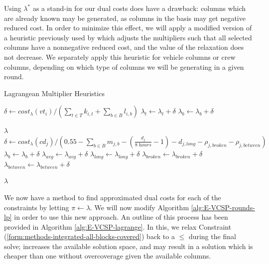 \documentclass[]{article}
\begin{document}
Using $\lambda^*$ as a stand-in for our dual costs does have a drawback: columns which are already known may be generated, as columns in the basis may get negative reduced cost. In order to minimize this effect, we will apply a modified version of a heuristic previously used by \citet{vanKootenNiekerk2017, Freling1997, Carraresi1995} which adjusts the multipliers such that all selected columns have a nonnegative reduced cost, and the value of the relaxation does not decrease. We separately apply this heuristic for vehicle columns or crew columns, depending on which type of columns we will be generating in a given round.
\begin{algorithm}[h]
\caption{Lagrangean Multiplier Heuristics}\label{alg:lagrange-multiplier-vt}
\begin{algorithmic}
 
  \State $\delta \gets cost_\lambda(vt_i) / (\sum_{t \in T} k_{i,t} + \sum_{b \in B} l_{i,b})$
    \State $\lambda_{t} \gets \lambda_{t} + \delta$
  \EndFor
    \State $\lambda_{b} \gets \lambda_{b} + \delta$
  \EndFor
\EndFor

\Return $\lambda$
\EndProcedure\\
 
    \State $\delta \gets cost_\lambda(cd_j) / (0.55 - \sum_{b \in B} m_{j,b} - (\frac{d_{j}}{\textit{8 hours}} - 1) - d_{j,\textit{long}} - \rho_{j,\textit{broken}} - \rho_{j,\textit{between}})$
      \State $\lambda_{b} \gets \lambda_{b} + \delta$
    \EndFor
    \State $\lambda_{avg} \gets \lambda_{avg} + \delta$
    \State $\lambda_{long} \gets \lambda_{long} + \delta$
    \State $\lambda_{broken} \gets \lambda_{broken} + \delta$
    \State $\lambda_{between} \gets \lambda_{between} + \delta$
  \EndFor

\Return $\lambda$
\EndProcedure
\end{algorithmic} 
\end{algorithm}

We now have a method to find approximated dual costs for each of the constraints by letting $\pi \gets \lambda$. We will now modify Algorithm \ref{alg:E-VCSP-rounds-lp} in order to use this new approach. An outline of this process has been provided in Algorithm \ref{alg:E-VCSP-lagrange}. In this, we relax Constraint (\ref{form:methods-integrated-all-blocks-covered}) back to a $\leq$ during the final solve; increases the available solution space, and may result in a solution which is cheaper than one without overcoverage given the available columns. 
\end{document}
